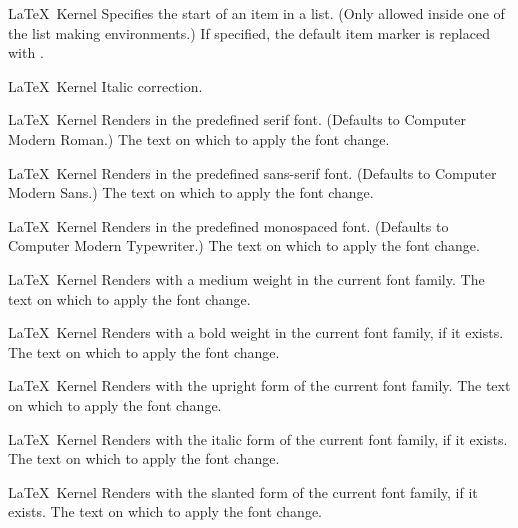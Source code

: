 %
 {}%
 {\LaTeX\ Kernel}%
 {Specifies the start of an item in a list. (Only allowed inside one of
  the list making environments.)}%
 {%
   \BeginArgList
     If specified, the default item marker is
     replaced with .
   \EndArgList
 }

%
 {}%
 {\LaTeX\ Kernel}%
 {Italic correction.}%
 {}

%
 {}%
 {\LaTeX\ Kernel}%
 {Renders  in the predefined serif font. (Defaults to
  Computer Modern Roman.)}%
 {%
   \BeginArgList
      The text on which to apply the font change.
   \EndArgList
 }

%
 {}%
 {\LaTeX\ Kernel}%
 {Renders  in the predefined sans-serif font. (Defaults to
  Computer Modern Sans.)}%
 {%
   \BeginArgList
      The text on which to apply the font change.
   \EndArgList
 }

%
 {}%
 {\LaTeX\ Kernel}%
 {Renders  in the predefined monospaced font. (Defaults to
  Computer Modern Typewriter.)}%
 {%
   \BeginArgList
      The text on which to apply the font change.
   \EndArgList
 }

%
 {}%
 {\LaTeX\ Kernel}%
 {Renders  with a medium weight in the current font
  family.}%
 {%
   \BeginArgList
      The text on which to apply the font change.
   \EndArgList
 }

%
 {}%
 {\LaTeX\ Kernel}%
 {Renders  with a bold weight in the current font family, if it exists.}%
 {%
   \BeginArgList
      The text on which to apply the font change.
   \EndArgList
 }

%
 {}%
 {\LaTeX\ Kernel}%
 {Renders  with the upright form of the current font family.}%
 {%
   \BeginArgList
      The text on which to apply the font change.
   \EndArgList
 }

%
 {}%
 {\LaTeX\ Kernel}%
 {Renders  with the italic form of the current font family, if it exists.}%
 {%
   \BeginArgList
      The text on which to apply the font change.
   \EndArgList
 }

%
 {}%
 {\LaTeX\ Kernel}%
 {Renders  with the slanted form of the current font family, if it exists.}%
 {%
   \BeginArgList
      The text on which to apply the font change.
   \EndArgList
 }

